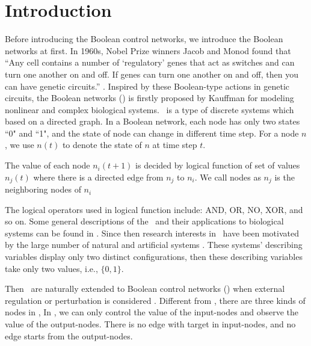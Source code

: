 \section{Introduction}
\label{sec:intro}


Before introducing the Boolean control networks, we introduce the Boolean networks at first. In 1960s, Nobel Prize winners Jacob and Monod found that ``Any cell contains a number of `regulatory' genes that act as switches and can turn one another on and off. If genes can turn one another on and off, then you can have genetic circuits.'' \cite{Jacob1961Genetic}. Inspired by these Boolean-type actions in genetic circuits, the Boolean networks (\BNs) is firstly proposed by Kauffman \cite{Kauffman1968Metabolic} for modeling nonlinear and complex biological systems. \BNs\ is a type of discrete systems which based on a directed graph. In a Boolean network, each node has only two states ``0" and ``1", and
the state of   node can change in different  time step.  For a node $n$, we use $n(t)$ to denote the state of $n$ at time step $t$.

The value of each node $n_i(t+1)$ is decided by logical function of  set of  values  $n_j(t)$  where  there is a directed edge from $n_j$ to $n_i$. We call nodes as $n_j$ is the neighboring nodes of $n_i$  

 The logical operators used in  logical function include: AND, OR, NO, XOR, and so on. Some general descriptions of the \BNs\ and their applications to biological systems can be found in \cite{Kauffman1968Metabolic}. Since then research interests in \BNs\ have been motivated by the large number of natural and artificial systems \cite{Akutsu2000Inferring, Shmulevich2002From, Faur2006Dynamical,Green2007The,Lou2010Multi}. These systems' describing variables display only two distinct configurations, then these describing variables take only two values, i.e., $\{0,1\}$.

        Then \BNs\ are naturally extended to Boolean control networks (\BCNs) when external regulation or perturbation is considered \cite{Ideker2001A}. Different from \BNs, there are three kinds of nodes in \BCNs,  In \BCNs, we can only control the value of the input-nodes and observe the value of the output-nodes. There is no edge with target in input-nodes, and no edge starts from the output-nodes.


